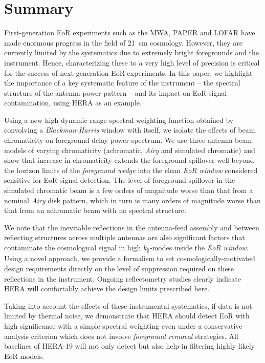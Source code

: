 \documentclass[preprint2,iop,numberedappendix,twocolappendix,appendixfloats]{emulateapj}
\begin{document}
\section{Summary}\label{sec:summary}

First-generation EoR experiments such as the MWA, PAPER and LOFAR have made enormous progress in the field of 21~cm cosmology. However, they are currently limited by the systematics due to extremely bright foregrounds and the instrument. Hence, characterizing these to a very high level of precision is critical for the success of next-generation EoR experiments. In this paper, we highlight the importance of a key systematic feature of the instrument -- the spectral structure of the antenna power pattern -- and its impact on EoR signal contamination, using HERA as an example. 

Using a new high dynamic range spectral weighting function obtained by convolving a {\it Blackman-Harris} window with itself, we isolate the effects of beam chromaticity on foreground delay power spectrum. We use three antenna beam models of varying chromaticity (achromatic, {\it Airy} and simulated chromatic) and show that increase in chromaticity extends the foreground spillover well beyond the horizon limits of the {\it foreground wedge} into the clean {\it EoR window} considered sensitive for EoR signal detection. The level of foreground spillover in the simulated chromatic beam is a few orders of magnitude worse than that from a nominal {\it Airy} disk pattern, which in turn is many orders of magnitude worse than that from an achromatic beam with no spectral structure. 

We note that the inevitable reflections in the antenna-feed assembly and between reflecting structures across multiple antennas are also significant factors that contaminate the cosmological signal in high $k_\parallel$-modes inside the {\it EoR window}. Using a novel approach, we provide a formalism to set cosmologically-motivated design requirements directly on the level of suppression required on these reflections in the instrument. Ongoing reflectometry studies clearly indicate HERA will comfortably achieve the design limits prescribed here.

Taking into account the effects of these instrumental systematics, if data is not limited by thermal noise, we demonstrate that HERA should detect EoR with high significance with a simple spectral weighting even under a conservative analysis criterion which does not involve {\it foreground removal} strategies. All baselines of HERA-19 will not only detect but also help in filtering highly likely EoR models. 
\end{document}
